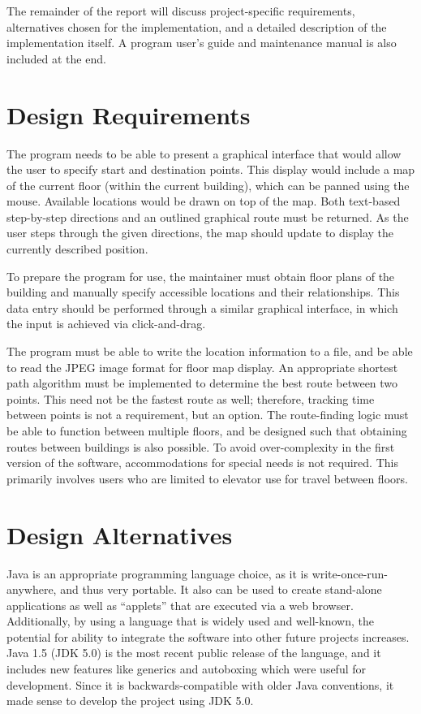 \documentclass[12pt,letterpaper,titlepage]{article}   %
\begin{document}
The remainder of the report will discuss project-specific requirements,
alternatives chosen for the implementation, and a detailed description
of the implementation itself. A program user's guide and maintenance
manual is also included at the end.


\section{Design Requirements}

The program needs to be able to present a graphical interface that would
allow the user to specify start and destination points. This display
would include a map of the current floor (within the current building),
which can be panned using the mouse. Available locations would be drawn
on top of the map. Both text-based step-by-step directions and an
outlined graphical route must be returned. As the user steps through the
given directions, the map should update to display the currently
described position.

To prepare the program for use, the maintainer must obtain floor plans
of the building and manually specify accessible locations and their
relationships. This data entry should be performed through a similar
graphical interface, in which the input is achieved via click-and-drag.

The program must be able to write the location information to a file,
and be able to read the JPEG image format for floor map display. An
appropriate shortest path algorithm must be implemented to determine the
best route between two points. This need not be the fastest route as
well; therefore, tracking time between points is not a requirement, but
an option. The route-finding logic must be able to function between
multiple floors, and be designed such that obtaining routes between
buildings is also possible. To avoid over-complexity in the first
version of the software, accommodations for special needs is not
required. This primarily involves users who are limited to elevator use
for travel between floors. 


\section{Design Alternatives}

Java is an appropriate programming language choice, as it is
write-once-run-anywhere, and thus very portable. It also can be used to
create stand-alone applications as well as ``applets'' that are executed
via a web browser. Additionally, by using a language that is widely used
and well-known, the potential for ability to integrate the software into
other future projects increases. Java 1.5 (JDK 5.0) is the most recent
public release of the language, and it includes new features like
generics and autoboxing which were useful for development. Since it is
backwards-compatible with older Java conventions, it made sense to
develop the project using JDK 5.0.
\end{document}

